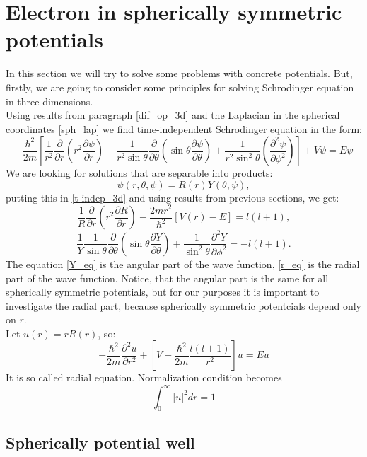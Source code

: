 \documentclass[a4paper, 11pt]{article}
\begin{document}
\section{Electron in spherically symmetric potentials}\label{e_sph_poten}
In this section we will try to solve some problems with concrete potentials. But, firstly, we are going to consider some principles for solving  Schrodinger equation in three dimensions.\\
Using results from paragraph \ref{dif_op_3d} and the Laplacian in the spherical coordinates \eqref{sph_lap}  we find time-independent Schrodinger equation in the form:
\begin{equation}\label{t-indep_3d}
-\frac{\hbar^2}{2m}[\frac{1}{r^2} \frac{\partial}{\partial r}({r^2}\frac{\partial \psi}{\partial r})+\frac{1}{r^2\sin{\theta}}\frac{\partial}{\partial \theta}(\sin{\theta}\frac{\partial \psi}{\partial \theta})+\frac{1}{r^2\sin^2{\theta}}(\frac{\partial^2 \psi}{\partial \phi^2}) ] + V\psi = E \psi
\end{equation}
We are looking for solutions that are separable into products:
$$\psi (r, \theta, \psi) = R(r)Y(\theta, \psi),$$
putting this in \eqref{t-indep_3d} and using results from previous sections, we get:
\begin{equation}\label{r_eq}
	\frac{1}{R}\frac{\partial}{\partial r}(r^2 \frac{\partial R}{\partial r}) - \frac{2m r^2}{\hbar^2}[V(r)-E] = l(l+1),
\end{equation}
\begin{equation}\label{Y_eq}
	\frac{1}{Y}\frac{1}{\sin \theta}\frac{\partial}{\partial \theta}(\sin \theta \frac{\partial Y}{\partial \theta}) + \frac{1}{\sin^2 \theta}\frac{\partial^2 Y}{\partial \phi^2}=-l(l+1).
\end{equation}
The equation \eqref{Y_eq} is the angular part of the wave function, \eqref{r_eq} is the radial part of the wave function. Notice, that  the angular part is the same for all spherically symmetric potentials, but for our purposes it is important to investigate the radial part, because spherically symmetric potentcials depend only on $r.$\\
Let $u(r) = r R(r)$, so:
\begin{equation}\label{r_eq}
	-\frac{\hbar^2}{2m}\frac{\partial^2 u}{\partial r^2}+[V+\frac{\hbar^2}{2m}\frac{l(l+1)}{r^2}]u = Eu
\end{equation}
It is so called radial equation. Normalization condition becomes
$$\int_{0}^{\infty} |u|^2  dr=1$$

\subsection{Spherically potential well}
\end{document}
